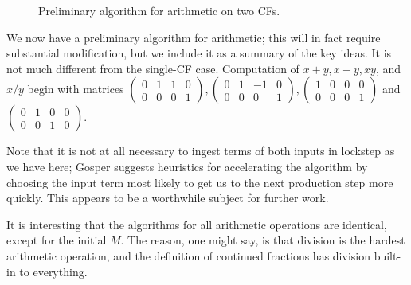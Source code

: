 \documentclass[11pt, oneside]{amsart}   	%
\newcommand{\bihomographic}[8]{\left(\begin{smallmatrix}#1&#2&#3&#4\\#5&#6&#7&#8\end{smallmatrix}\right)}
\newcommand{\abcd}{\left(
\begin{smallmatrix} 
a & b & c & d\\ 
e & f & g & h
\end{smallmatrix}
\right)}
\begin{document}
\begin{figure}
\begin{algorithmic}\label{fig:twoCFarithPrelim}
 
 
\STATE{$M \gets \abcd$} 
           \ENDWHILE
\ENDWHILE
\end{algorithmic}
\caption{Preliminary algorithm for arithmetic on two CFs.}
\end{figure}

We now have a preliminary algorithm for arithmetic; this will in fact require substantial modification, but we include it as a summary of the key ideas. It is not much different from the single-CF case. Computation of $x+y, x-y,xy$, and $x/y$ begin with matrices $\bihomographic{0}{1}{1}{0}{0}{0}{0}{1}, \bihomographic{0}{1}{-1}{0}{0}{0}{0}{1}, \bihomographic{1}{0}{0}{0}{0}{0}{0}{1}$ and $\bihomographic{0}{1}{0}{0}{0}{0}{1}{0}$.

Note that it is not at all necessary to ingest terms of both inputs in lockstep as we have here;
Gosper suggests heuristics for accelerating the algorithm by choosing the input term most likely to get us to the next production step more quickly. This appears to be a worthwhile subject for further work.

It is interesting that the algorithms for all arithmetic operations are identical, except for the initial $M$. The reason, one might say, is that division is the hardest arithmetic operation, and the definition of continued fractions has division built-in to everything.
\end{document}
